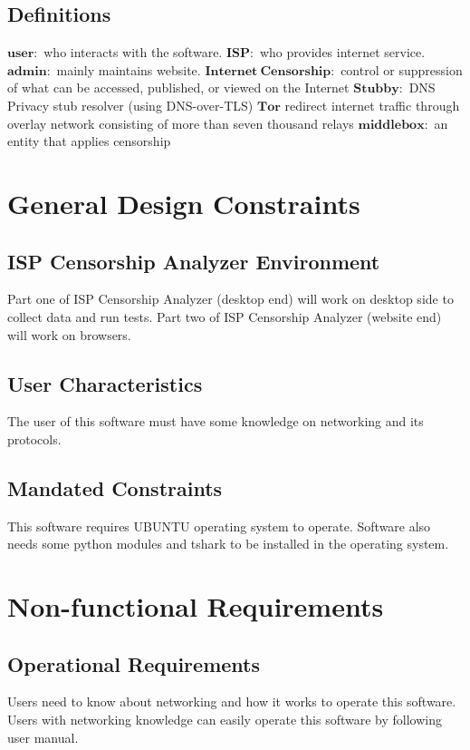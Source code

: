 \documentclass[12pt]{article}
\begin{document}
\subsection{Definitions}
$\boldsymbol{user:}$ who interacts with the software.\newline
$\boldsymbol{ISP:}$ who provides internet service.\newline
$\boldsymbol{admin:}$ mainly maintains website.\newline
$\boldsymbol{Internet\ Censorship:}$ control or suppression of what can be accessed, published, or viewed on the Internet\newline
$\boldsymbol{Stubby:}$ DNS Privacy stub resolver (using DNS-over-TLS)\newline
$\boldsymbol{Tor}$ redirect internet traffic through overlay network consisting of more than seven thousand relays\newline
$\boldsymbol{middle box:}$ an entity that applies censorship 

\section{General Design Constraints}
\subsection{ISP Censorship Analyzer Environment}
Part one of ISP Censorship Analyzer (desktop end) will work on desktop side to collect data and run tests.
Part two of ISP Censorship Analyzer (website end) will work on browsers.
\subsection{User Characteristics}
The user of this software must have some knowledge on networking and its protocols.
\subsection{Mandated Constraints}
This software requires UBUNTU operating system to operate.
Software also needs some python modules and tshark to be installed in the operating system.
\section{Non-functional Requirements}
\subsection{Operational Requirements}
Users need to know about networking and how it works to operate this software. Users with networking knowledge can easily operate this software by following user manual.
\end{document}
